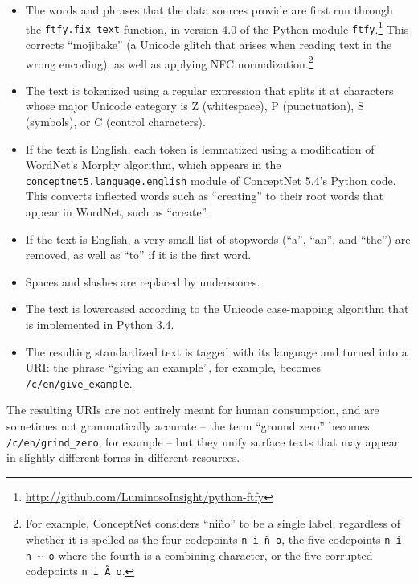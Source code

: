 \documentclass[letterpaper]{article}
\begin{document}
\begin{itemize}
\item The words and phrases that the data sources provide are first run
    through the {\tt ftfy.fix\_text} function, in version 4.0 of the Python
    module {\tt ftfy}.\footnote{
        \url{http://github.com/LuminosoInsight/python-ftfy}
    } This corrects ``mojibake'' (a Unicode glitch that arises when reading
    text in the wrong encoding), as well as applying NFC normalization.\footnote{
        For example, ConceptNet considers ``ni\~{n}o'' to be a single
        label, regardless of whether it is spelled as the four codepoints
        {\tt n i \~{n} o}, the five codepoints {\tt n i n \textasciitilde{} o}
        where the fourth is a combining character,
        or the five corrupted codepoints {\tt n i \~{A} \textpm{} o}.
    }
\item The text is tokenized using a regular expression that splits it at
    characters whose major Unicode category is Z (whitespace), P (punctuation),
    S (symbols), or C (control characters).
\item If the text is English, each token is lemmatized using a modification of
    WordNet's Morphy algorithm, which appears in the {\tt conceptnet5.language.english}
    module of ConceptNet 5.4's Python code. This converts inflected words such
    as ``creating'' to their root words that appear in WordNet, such as
    ``create''.
\item If the text is English, a very small list of stopwords (``a'', ``an'',
    and ``the'') are removed, as well as ``to'' if it is the first word.
\item Spaces and slashes are replaced by underscores.
\item The text is lowercased according to the Unicode case-mapping algorithm
    that is implemented in Python 3.4.
\item The resulting standardized text is tagged with its language and turned
    into a URI: the phrase ``giving an example'', for example, becomes
    {\tt /c/en/give\_example}.
\end{itemize}

 The resulting URIs are not entirely meant for human consumption, and are
sometimes not grammatically accurate -- the term ``ground zero'' becomes {\tt
/c/en/grind\_zero}, for example -- but they unify surface texts that may appear
in slightly different forms in different resources.
\end{document}
